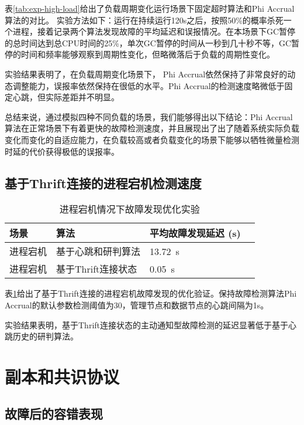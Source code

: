 表\ref{tab:exp-high-load}给出了负载周期变化运行场景下固定超时算法和Phi Accrual算法的对比。
实验方法如下：运行在持续运行120s之后，按照50\%的概率杀死一个进程，接着记录两个算法发现故障的平均延迟和误报情况。在本场景下GC暂停的总时间达到总CPU时间的25\%，单次GC暂停的时间从一秒到几十秒不等，GC暂停的时间和频率能够观察到周期性变化，但略微落后于负载的周期性变化。

实验结果表明了，在负载周期变化场景下，
Phi Accrual依然保持了非常良好的动态调整能力，误报率依然保持在很低的水平。Phi Accrual的检测速度略微低于固定心跳，但实际差距并不明显。

总结来说，通过模拟四种不同负载的场景，我们能够得出以下结论：Phi Accrual算法在正常场景下有着更快的故障检测速度，并且展现出了出了随着系统实际负载变化而变化的自适应能力，在负载较高或者负载变化的场景下能够以牺牲微量检测时延的代价获得极低的误报率。


\subsection{基于Thrift连接的进程宕机检测速度}

\begin{table}[h!]
    \centering
    \caption{进程宕机情况下故障发现优化实验}
    \label{tab:exp-thrift-process-down}
    \begin{tabular}{@{}llll@{}}
        \toprule
        场景 & 算法 & 平均故障发现延迟 (s) \\
        \midrule
        进程宕机 & 基于心跳和研判算法 & \SI{13.72}{\second}  \\
        进程宕机 & 基于Thrift连接状态 & \SI{0.05}{\second}  \\
        \bottomrule
    \end{tabular}
\end{table}

表\ref{tab:exp-thrift-process-down}给出了基于Thrift连接的进程宕机故障发现的优化验证。保持故障检测算法Phi Accrual的默认参数检测阈值为30，管理节点和数据节点的心跳间隔为1s。

实验结果表明，基于Thrift连接状态的主动通知型故障检测的延迟显著低于基于心跳历史的研判算法。


\section{副本和共识协议}

\subsection{故障后的容错表现}

